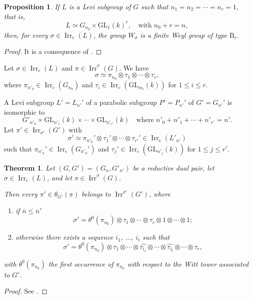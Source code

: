 \documentclass[12pt]{amsart}
\numberwithin{equation}{subsection}
\newtheorem{prop}[equation]{Proposition}
\newtheorem{thm}[equation]{Theorem}
\newcommand{\Irr}{\operatorname{Irr}}
\newcommand{\GL}{\mathrm{GL}}
\newcommand{\cc}{\mathrm{c}}
\def\rB{{\mathrm{B}}}
\def\cc{\mathrm{sc}}
\def\cc{{\mathrm{c}}}
\begin{document}
\begin{prop} 
If  $L$ is a Levi subgroup of $G$ such that $n_1=n_2=\cdots=n_r=1$, that is, 
\begin{equation} \label{eqn:LeviMQZ}
L\simeq G_{n_0}\times \GL_{1}(k)^r,\quad\text{with $n_0+r=n$},
\end{equation}
then, for every  $\sigma\in \Irr_\cc(L)$, the group $W_\sigma$ is a finite Weyl group of type $\rB_r$.
\end{prop}
\begin{proof}
It is a consequence of  \cite[Theorem~1.2]{MQZ}.
\end{proof}

Let $\sigma\in\Irr_\cc(L)$ and $\pi\in\Irr^\sigma(G)$. We have
\begin{equation}
\sigma\simeq\pi_{n_0}\otimes\tau_1\otimes\cdots\otimes\tau_r,
\end{equation}
where $\pi_{n'_0}\in\Irr_\cc(G_{n_0})$ and $\tau_i\in\Irr_\cc(\GL_{m_i}(k))$ for $1\le i\le r$.

A Levi subgroup $L'=L_{n'}'$ of a parabolic subgroup $P'=P_{n'}'$ of $G'=G_{n'}'$ is isomorphic to 
\begin{equation}
G'_{n'_0}\times \GL_{n'_1}(k)\times\cdots\times\GL_{n'_{r'}}(k)\quad\text{where $n'_0+n'_1+\cdots+n'_{r'}=n'$.}
\end{equation}
Let $\pi'\in\Irr_{\sigma'}(G')$ with
\begin{equation}
\sigma'\simeq\pi_{n'_0}'\otimes\tau_1'\otimes\cdots\otimes\tau_{r'}'\in\Irr_\cc(L'_{n'})
\end{equation}
such that $\pi_{n'_0}'\in\Irr_\cc(G_{n'_0}')$ and $\tau_j'\in\Irr_\cc(\GL_{n'_j}(k))$ for $1\le j\le r'$. 

\begin{thm} \label{thm:HC-HC}
Let $(G,G')=(G_n,G'_{n'})$ be a reductive dual pair, let $\sigma\in\Irr_\cc(L)$, and let $\pi\in\Irr^\sigma(G)$. 

Then every $\pi'\in\theta_{G'}(\pi)$ belongs to $\Irr^{\sigma'}(G')$, where
\begin{enumerate} 
\item if $\overline{n}\le\overline{n}'$
\[\sigma'=\theta^0(\pi_{n_0})\otimes\tau_1\otimes\cdots\otimes\tau_r\otimes 1\otimes\cdots\otimes 1;\]
\item otherwise there exists a sequence $i_1$, $\ldots$, $i_t$ such that
\[\sigma'=\theta^0(\pi_{n_0})\otimes\tau_1\otimes\cdots\otimes\widehat{\tau_{i_1}}\otimes\cdots\otimes\widehat{\tau_{i_t}}\otimes\cdots\otimes\tau_r,\]
\end{enumerate}
with $\theta^0(\pi_{n_0})$ the first  occurrence of $\pi_{n_0}$ with respect to the Witt tower associated to $G'$.
\end{thm}
\begin{proof}
See \cite[Th\'eor\`eme~3.7]{AMR}.
\end{proof}
\end{document}
